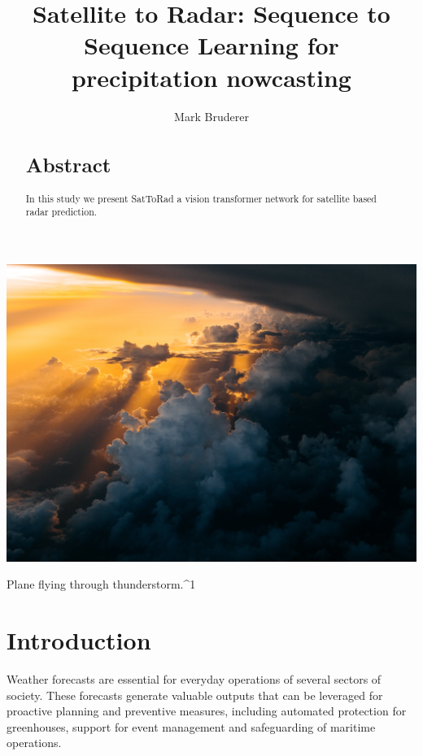 \documentclass[acmtog, authorversion]{acmart}
\begin{document}
\title{Satellite to Radar: Sequence to Sequence Learning for precipitation nowcasting}

\author{Mark Bruderer}

\renewcommand{\shortauthors}{Mark Bruderer}

\begin{abstract}
\section*{Abstract}
In this study we present SatToRad a vision transformer network for satellite based radar prediction.
\end{abstract}



\begin{teaserfigure}
  \includegraphics*[width=\textwidth, trim= 0in 16.0in 0in 16.0in]{./images/storm.jpg}
  \caption{Plane flying through thunderstorm.^1}
  \label{fig:teaser}
\end{teaserfigure}

\maketitle

\section{Introduction}
Weather forecasts are essential for everyday operations of several sectors of society. These forecasts generate valuable outputs that can be leveraged for proactive planning and preventive measures, including automated protection for greenhouses, support for event management and safeguarding of maritime operations.
\end{document}

